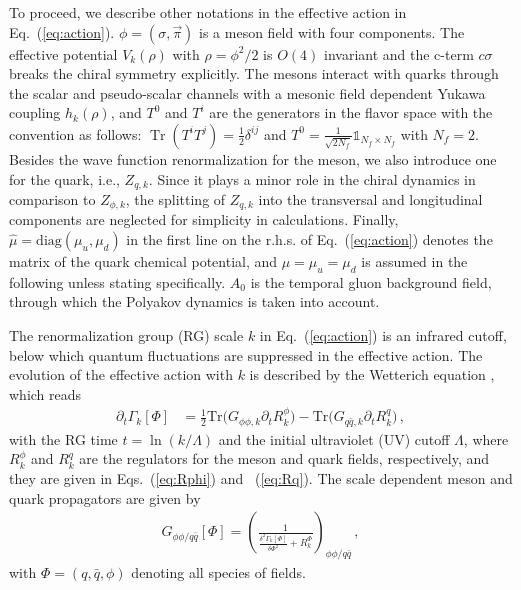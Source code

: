 \documentclass[%
reprint,
superscriptaddress,
showpacs,preprintnumbers,
 amsmath,amssymb,
 aps,
prd,
]{revtex4-1}
\newcommand{\Tr}{\ensuremath{\operatorname{Tr}}}
\def\Eq#1{Eq.~(\ref{#1})}
\begin{document}
To proceed, we describe other notations in the effective action in \Eq{eq:action}. $\phi=\left(\sigma,\vec{\pi}\right)$ is a meson field with four components. The effective potential $V_k(\rho)$ with $\rho=\phi^2/2$ is $O(4)$ invariant and the c-term $c\sigma$ breaks the chiral symmetry explicitly. The mesons interact with quarks through the scalar and pseudo-scalar channels with a mesonic field dependent Yukawa coupling $h_k(\rho)$, and $T^0$ and $T^i$ are the generators in the flavor space with the convention as follows: $\Tr(T^{i}T^{j})=\frac{1}{2}\delta^{ij}$ and $T^{0}=\frac{1}{\sqrt{2N_{f}}}\mathbb{1}_{N_{f}\times N_{f}}$ with $N_{f}=2$. Besides the wave function renormalization for the meson, we also introduce one for the quark, i.e., $Z_{q,k}$. Since it plays a minor role in the chiral dynamics in comparison to $Z_{\phi,k}$, the splitting of $Z_{q,k}$ into the transversal and longitudinal components are neglected for simplicity in calculations. Finally, $\hat\mu=\mathrm{diag}(\mu_u,\mu_d)$ in the first line on the r.h.s. of \Eq{eq:action} denotes the matrix of the quark chemical potential, and $\mu=\mu_u=\mu_d$ is assumed in the following unless stating specifically. $A_0$ is the temporal gluon background field, through which the Polyakov dynamics is taken into account.

The renormalization group (RG) scale $k$ in \Eq{eq:action} is an infrared cutoff, below which quantum fluctuations are suppressed in the effective action. The evolution of the effective action with $k$ is described by the Wetterich equation \cite{Wetterich:1992yh}, which reads 
\begin{align}
  \partial_t\Gamma_k[\Phi]&=\frac{1}{2}\mathrm{Tr}\big(G_{\phi\phi,k}\partial_t R^{\phi}_{k}\big)-\mathrm{Tr}\big(G_{q\bar{q},k}\partial_t R^{q}_{k}\big)\,, \label{eq:WetterichEqPQM}
\end{align}
with the RG time $t=\ln (k/\Lambda)$ and the initial ultraviolet (UV) cutoff $\Lambda$, where $R^{\phi}_{k}$ and $R^{q}_{k}$ are the regulators for the meson and quark fields, respectively, and they are given in Eqs.~(\ref{eq:Rphi}) and ~(\ref{eq:Rq}). The scale dependent meson and quark propagators are given by
\begin{align}
  G_{\phi\phi/q\bar{q}}[\Phi]=\left( \frac{1}{\frac{\delta^2\Gamma_k[\Phi]}{\delta\Phi^2}+R^{\Phi}_{k}} \right)_{\phi\phi/q\bar{q}}\,, \label{eq:props}
\end{align}
with $\Phi=(q,\bar q,\phi)$ denoting all species of fields.
\end{document}
